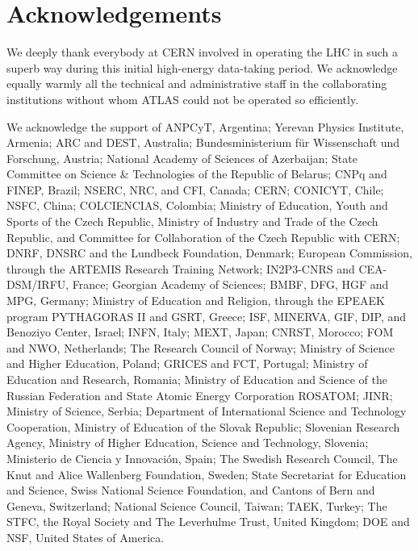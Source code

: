 \documentclass[11pt,a4paper,dvips]{article}
\begin{document}
\section{Acknowledgements}

We deeply thank everybody at CERN involved in operating the LHC in such a superb way during this initial high-energy data-taking period. We acknowledge equally warmly all the technical and administrative staff in the collaborating institutions without whom ATLAS could not be operated so efficiently. 

We acknowledge the support of ANPCyT, Argentina; Yerevan Physics Institute, Armenia; ARC and DEST, Australia; Bundesministerium f\"ur Wissenschaft und Forschung, Austria; National Academy of Sciences of Azerbaijan; State Committee on Science \& Technologies of the Republic of Belarus; CNPq and FINEP, Brazil; NSERC, NRC, and CFI, Canada; CERN; CONICYT, Chile; NSFC, China; COLCIENCIAS, Colombia; Ministry of Education, Youth and Sports of the Czech Republic, Ministry of Industry and Trade of the Czech Republic, and Committee for Collaboration of the Czech Republic with CERN; DNRF, DNSRC and the Lundbeck Foundation, Denmark; European Commission, through the ARTEMIS Research Training Network; IN2P3-CNRS and CEA-DSM/IRFU, France; Georgian Academy of Sciences; BMBF, DFG, HGF and MPG, Germany; Ministry of Education and Religion, through the EPEAEK program PYTHAGORAS II and GSRT, Greece; ISF, MINERVA, GIF, DIP, and Benoziyo Center, Israel; INFN, Italy; MEXT, Japan; CNRST, Morocco; FOM and NWO, Netherlands; The Research Council of Norway; Ministry of Science and Higher Education, Poland; GRICES and FCT, Portugal; Ministry of Education and Research, Romania; Ministry of Education and Science of the Russian Federation and State Atomic Energy Corporation ROSATOM; JINR; Ministry of Science, Serbia; Department of International Science and Technology Cooperation, Ministry of Education of the Slovak Republic; Slovenian Research Agency, Ministry of Higher Education, Science and Technology, Slovenia; Ministerio de Ciencia y Innovaci\'{o}n, Spain; The Swedish Research Council, The Knut and Alice Wallenberg Foundation, Sweden; State Secretariat for Education and Science, Swiss National Science Foundation, and Cantons of Bern and Geneva, Switzerland; National Science Council, Taiwan; TAEK, Turkey; The STFC, the Royal Society and The Leverhulme Trust, United Kingdom; DOE and NSF, United States of America. 
\end{document}
